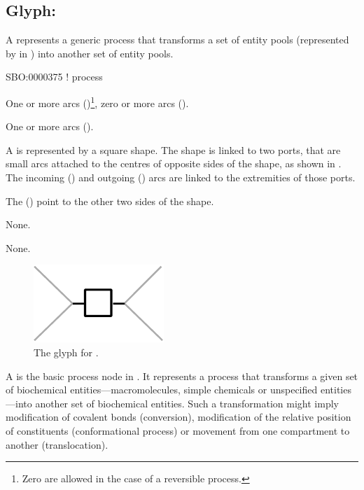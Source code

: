 \subsection{Glyph: }
\label{sec:process}

A  represents a generic process that transforms a set of entity pools (represented by  in \SBGNPDLone) into another set of entity pools.

\begin{glyphDescription}

\glyphSboTerm
SBO:0000375 ! process


\glyphIncoming
One or more  arcs ()\footnote{Zero  are allowed in the case of a reversible process.}, zero or more  arcs ().






\glyphOutgoing
One or more  arcs ().




\glyphContainer
A  is represented by a square shape.
The shape is linked to two ports, that are small arcs attached to the centres of opposite sides of the shape, as shown in .
The incoming  () and outgoing  () arcs are linked to the extremities of those ports.

The  () point to the other two sides of the shape.

\glyphLabel
None.

\glyphAux
None.

\end{glyphDescription}

\begin{figure}[H]
  \centering
  \includegraphics{images/build/process.pdf}
  \caption{The \PD glyph for .}
  \label{fig:process}
\end{figure}

A  is the basic process node in \PD.  It represents a process that transforms a given set of biochemical entities---macromolecules, simple chemicals or unspecified entities---into another set of biochemical entities.  Such a transformation might imply modification of covalent bonds (conversion), modification of the relative position of constituents (conformational process) or movement from one compartment to another (translocation).

